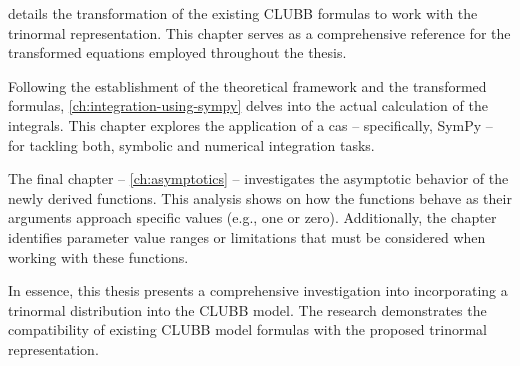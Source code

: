 details the transformation of the existing \gls{CLUBB} formulas to work with the trinormal representation.
This chapter serves as a comprehensive reference for the transformed equations employed throughout the thesis.

Following the establishment of the theoretical framework and the transformed formulas,
\cref{ch:integration-using-sympy} delves into the actual calculation of the integrals.
This chapter explores the application of a \gls{cas} -- specifically, SymPy --
for tackling both, symbolic and numerical integration tasks.

The final chapter -- \cref{ch:asymptotics} --
investigates the asymptotic behavior of the newly derived functions.
This analysis shows on how the functions behave as their arguments approach specific values (e.g., one or zero).
Additionally, the chapter identifies parameter value ranges or limitations
that must be considered when working with these functions.

In essence, this thesis presents a comprehensive investigation into  incorporating a trinormal distribution into the \gls{CLUBB} model.
The research demonstrates the compatibility of existing \gls{CLUBB} model formulas with the proposed trinormal representation.
